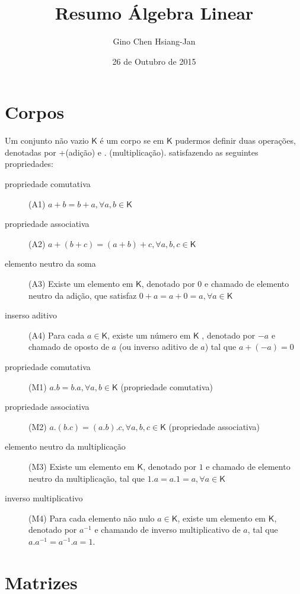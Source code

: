 \documentclass[10pt,a4paper]{article}
\author{Gino Chen Hsiang-Jan}
\title{Resumo Álgebra Linear}
\date{26 de Outubro de 2015}
\begin{document}
\section{Corpos}
\begin{definition}
	Um conjunto não vazio $\mathsf{K}$ é um corpo se em $\mathsf{K}$ pudermos definir duas operações, denotadas por +(adição) e . (multiplicação). satisfazendo as seguintes propriedades:
	\begin{description}
		\item[propriedade comutativa] (A1) $a + b = b + a, \forall a, b \in \mathsf{K}$ 
		\item[propriedade associativa] (A2) $a + (b + c) = (a + b) + c, \forall a, b, c \in \mathsf{K}$ 
		\item[elemento neutro da soma] (A3) Existe um elemento em $\mathsf{K}$, denotado por $0$ e chamado de elemento neutro da adição, que satisfaz $0 + a = a + 0 = a, \forall a \in \mathsf{K}$
		\item[inserso aditivo] (A4) Para cada $a \in \mathsf{K}$, existe um número em $\textsf{K}$ , denotado por $-a$ e chamado de oposto de $a$ (ou inverso aditivo de $a$) tal que $a + (-a) = 0$
		\item[propriedade comutativa] (M1) $a.b = b.a, \forall a, b \in \mathsf{K}$ (propriedade comutativa)
		\item[propriedade associativa] (M2) $a.(b.c) = (a.b).c, \forall a, b, c \in \mathsf{K}$ (propriedade associativa)
		\item[elemento neutro da multiplicação] (M3) Existe um elemento em $\mathsf{K}$, denotado por $1$ e chamado de elemento neutro da multiplicação, tal que $1.a = a.1 = a, \forall a \in \mathsf{K}$
		\item[inverso multiplicativo] (M4) Para cada elemento não nulo $a \in \mathsf{K}$, existe um elemento em $\mathsf{K}$, denotado por $a^{-1}$ e chamando de inverso multiplicativo  de $a$, tal que $a.a^{-1} = a^{-1}.a = 1$.
	\end{description}
\end{definition}

\section{Matrizes}
\end{document}
